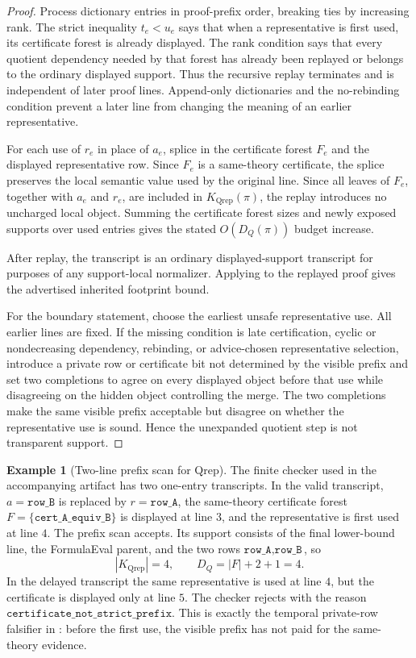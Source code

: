 \documentclass[11pt]{article}
\theoremstyle{definition}
\newtheorem{example}[theorem]{Example}
\begin{document}
\begin{proof}
Process dictionary entries in proof-prefix order, breaking ties by increasing rank.  The strict inequality \(t_e<u_e\) says that when a representative is first used, its certificate forest is already displayed.  The rank condition says that every quotient dependency needed by that forest has already been replayed or belongs to the ordinary displayed support.  Thus the recursive replay terminates and is independent of later proof lines.  Append-only dictionaries and the no-rebinding condition prevent a later line from changing the meaning of an earlier representative.

For each use of \(r_e\) in place of \(a_e\), splice in the certificate forest \(F_e\) and the displayed representative row.  Since \(F_e\) is a same-theory certificate, the splice preserves the local semantic value used by the original line.  Since all leaves of \(F_e\), together with \(a_e\) and \(r_e\), are included in \(K_{\mathrm{Qrep}}(\pi)\), the replay introduces no uncharged local object.  Summing the certificate forest sizes and newly exposed supports over used entries gives the stated \(O(D_Q(\pi))\) budget increase.

After replay, the transcript is an ordinary displayed-support transcript for purposes of any support-local normalizer.  Applying  to the replayed proof gives the advertised inherited footprint bound.

For the boundary statement, choose the earliest unsafe representative use.  All earlier lines are fixed.  If the missing condition is late certification, cyclic or nondecreasing dependency, rebinding, or advice-chosen representative selection, introduce a private row or certificate bit not determined by the visible prefix and set two completions to agree on every displayed object before that use while disagreeing on the hidden object controlling the merge.  The two completions make the same visible prefix acceptable but disagree on whether the representative use is sound.  Hence the unexpanded quotient step is not transparent support.
\end{proof}

\begin{example}[Two-line prefix scan for Qrep]\label{ex:qrep-prefix-scan}
The finite checker used in the accompanying artifact has two one-entry transcripts.  In the valid transcript, \(a=\texttt{row\_B}\) is replaced by \(r=\texttt{row\_A}\), the same-theory certificate forest \(F=\{\texttt{cert\_A\_equiv\_B}\}\) is displayed at line \(3\), and the representative is first used at line \(4\).  The prefix scan accepts.  Its support consists of the final lower-bound line, the FormulaEval parent, and the two rows \(\texttt{row\_A},\texttt{row\_B}\), so
\[
  |K_{\mathrm{Qrep}}|=4,
  \qquad
  D_Q=|F|+2+1=4.
\]
In the delayed transcript the same representative is used at line \(4\), but the certificate is displayed only at line \(5\).  The checker rejects with the reason \(\texttt{certificate\_not\_strict\_prefix}\).  This is exactly the temporal private-row falsifier in : before the first use, the visible prefix has not paid for the same-theory evidence.
\end{example}
\end{document}
